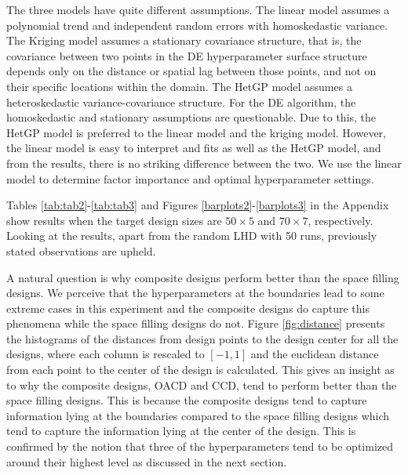 \documentclass [PhD] {package/uclathes}
\begin{document}
The three models have quite different assumptions. The linear model assumes a polynomial trend and independent random errors with homoskedastic variance. The Kriging model assumes a stationary covariance structure, that is, the covariance between two points in the DE hyperparameter surface structure depends only on the distance or spatial lag between those points, and not on their specific locations within the domain. The HetGP model assumes a heteroskedastic variance-covariance structure. For the DE algorithm, the homoskedastic and stationary assumptions are questionable. Due to this, the HetGP model is preferred to the linear model and the kriging model. However, the linear model is easy to interpret and fits as well as the HetGP model, and from the results, there is no striking difference between the two. We use the linear model to determine factor importance and optimal hyperparameter settings.



Tables \ref{tab:tab2}-\ref{tab:tab3} and
Figures \ref{barplots2}-\ref{barplots3} in the Appendix show results when the target design sizes are $50\times 5$ and $70\times7$, respectively.
Looking at the results, apart from the random LHD with 50 runs, previously stated observations are upheld. %


A natural question is why composite designs perform better than the space filling designs. We perceive that the hyperparameters at the boundaries lead to some extreme cases in this experiment and the composite  designs do capture this phenomena while the space filling designs do not. Figure \ref{fig:distance} presents the histograms of the distances from design points to the design center for all the designs, where each column is rescaled to $[-1, 1]$ and  the euclidean distance from each point to the center of the design is calculated. This gives an insight as to why the composite designs, OACD and CCD, tend to perform better than the space filling designs. This is because the composite designs tend to capture information lying at the boundaries compared to the space filling designs which tend to capture the information lying at the center of the design. This is confirmed by the notion that three of the hyperparameters tend to be optimized around their highest level as discussed in the next section.
\end{document}
